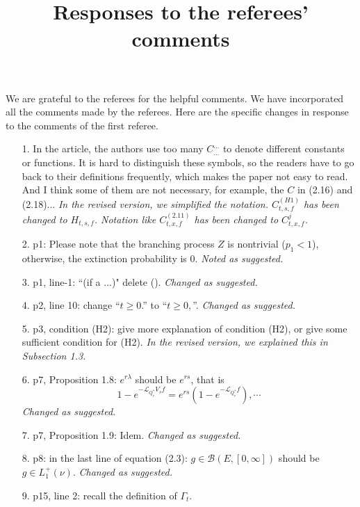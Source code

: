 \documentclass[12pt,a4paper]{amsart}
\title[Responses]{\large Responses to the referees' comments}
\begin{document}
\maketitle	
	We are grateful to the referees for the helpful comments.
	We have incorporated all the comments made by the referees.
	Here are the specific changes in response to the comments of the first referee.
\begin{itemize}
\item[1.]
	In the article, the authors use too many $C_{\dots}^{\dots}$ to denote different constants or functions.
	It is hard to distinguish these symbols, so the readers have to go back to their definitions frequently, which makes the paper not easy to read.
	And I think some of them are not necessary, for example, the $C$ in (2.16) and (2.18)...	
	{\it In the revised version, we
simplified the notation. $C^{(H1)}_{t,s,f}$ has been changed to $H_{t,s,f}$. Notation like $C^{(2.11)}_{t,x,f}$ has been changed to $C^j_{t, x, f}$.}
\\	
\item[2.]
	p1: Please note that the branching process $Z$ is nontrivial ($p_1<1$), otherwise, the extinction probability is $0$. 	
	{\it Noted as suggested.}
\\	
\item[3.]
	p1, line-1: ``(if a ...)" delete ().	
	{\it Changed as suggested.}
\\
\item[4.]
	p2, line 10: change ``$t\geq 0$.'' to ``$t\geq 0,$''.
	{\it Changed as suggested.}
\\
\item[5.]
	p3, condition (H2): give more explanation of condition (H2), or give some sufficient condition for (H2).
	{\it In the revised version, we explained this in Subsection 1.3.}
\\
\item[6.]
	p7, Proposition 1.8: $e^{r\lambda}$ should be $e^{rs}$, that is
\[
	1 - e^{- \mathcal L_{Q_r^*} V_sf} = e^{rs} (1 - e^{- \mathcal L_{Q_r^*}f}), \cdots
\]
	{\it Changed as suggested.}
\\
\item[7.]
	p7, Proposition 1.9: Idem.
	{\it Changed as suggested.}
\\
\item[8.]
	p8: in the last line of equation (2.3): $g\in \mathcal B(E,[0,\infty])$ should be $g\in L_1^+(\nu)$.	
	{\it Changed as suggested.}
\\	
\item[9.]
	p15, line 2: recall the definition of $\Gamma_t$.

\end{itemize}
\end{document}
